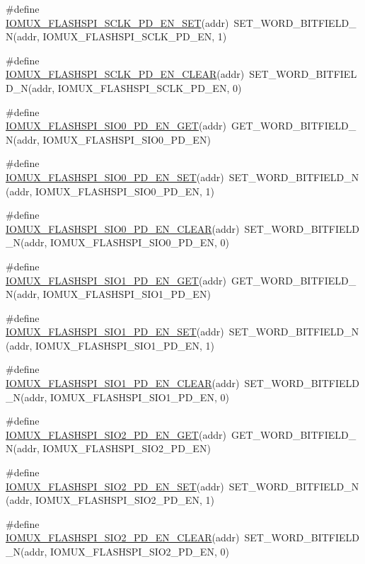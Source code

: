 \begin{DoxyCompactItemize}
\#define \hyperlink{a00559_a5d93eeb597e9b628d1bd05c7233ee576}{IOMUX\_\-FLASHSPI\_\-SCLK\_\-PD\_\-EN\_\-SET}(addr)~SET\_\-WORD\_\-BITFIELD\_\-N(addr, IOMUX\_\-FLASHSPI\_\-SCLK\_\-PD\_\-EN, 1)
\item 
\#define \hyperlink{a00559_a0ef3e525e7ec183a6f9c9f821fcd6159}{IOMUX\_\-FLASHSPI\_\-SCLK\_\-PD\_\-EN\_\-CLEAR}(addr)~SET\_\-WORD\_\-BITFIELD\_\-N(addr, IOMUX\_\-FLASHSPI\_\-SCLK\_\-PD\_\-EN, 0)
\item 
\#define \hyperlink{a00559_a912bccecd8802c114ba8db270a81d986}{IOMUX\_\-FLASHSPI\_\-SIO0\_\-PD\_\-EN\_\-GET}(addr)~GET\_\-WORD\_\-BITFIELD\_\-N(addr, IOMUX\_\-FLASHSPI\_\-SIO0\_\-PD\_\-EN)
\item 
\#define \hyperlink{a00559_ad2c2ae01b2a7109abd76466ffa73b062}{IOMUX\_\-FLASHSPI\_\-SIO0\_\-PD\_\-EN\_\-SET}(addr)~SET\_\-WORD\_\-BITFIELD\_\-N(addr, IOMUX\_\-FLASHSPI\_\-SIO0\_\-PD\_\-EN, 1)
\item 
\#define \hyperlink{a00559_ab7114dd2253ab6a347e89a6a0631cfa2}{IOMUX\_\-FLASHSPI\_\-SIO0\_\-PD\_\-EN\_\-CLEAR}(addr)~SET\_\-WORD\_\-BITFIELD\_\-N(addr, IOMUX\_\-FLASHSPI\_\-SIO0\_\-PD\_\-EN, 0)
\item 
\#define \hyperlink{a00559_a2a32273048798fe0f20cd1c2c74b0a70}{IOMUX\_\-FLASHSPI\_\-SIO1\_\-PD\_\-EN\_\-GET}(addr)~GET\_\-WORD\_\-BITFIELD\_\-N(addr, IOMUX\_\-FLASHSPI\_\-SIO1\_\-PD\_\-EN)
\item 
\#define \hyperlink{a00559_a971f7af788d17b7d01c99dfe754c275d}{IOMUX\_\-FLASHSPI\_\-SIO1\_\-PD\_\-EN\_\-SET}(addr)~SET\_\-WORD\_\-BITFIELD\_\-N(addr, IOMUX\_\-FLASHSPI\_\-SIO1\_\-PD\_\-EN, 1)
\item 
\#define \hyperlink{a00559_a13342cb50d1f37d489363c90dca905a5}{IOMUX\_\-FLASHSPI\_\-SIO1\_\-PD\_\-EN\_\-CLEAR}(addr)~SET\_\-WORD\_\-BITFIELD\_\-N(addr, IOMUX\_\-FLASHSPI\_\-SIO1\_\-PD\_\-EN, 0)
\item 
\#define \hyperlink{a00559_afad954016e6847083059b5d1eb38e656}{IOMUX\_\-FLASHSPI\_\-SIO2\_\-PD\_\-EN\_\-GET}(addr)~GET\_\-WORD\_\-BITFIELD\_\-N(addr, IOMUX\_\-FLASHSPI\_\-SIO2\_\-PD\_\-EN)
\item 
\#define \hyperlink{a00559_a3a686bd6ccda2a15ef28267aa5376909}{IOMUX\_\-FLASHSPI\_\-SIO2\_\-PD\_\-EN\_\-SET}(addr)~SET\_\-WORD\_\-BITFIELD\_\-N(addr, IOMUX\_\-FLASHSPI\_\-SIO2\_\-PD\_\-EN, 1)
\item 
\#define \hyperlink{a00559_a875fc50b25ca7902a15c5272bb61b2b7}{IOMUX\_\-FLASHSPI\_\-SIO2\_\-PD\_\-EN\_\-CLEAR}(addr)~SET\_\-WORD\_\-BITFIELD\_\-N(addr, IOMUX\_\-FLASHSPI\_\-SIO2\_\-PD\_\-EN, 0)
\item 

\end{DoxyCompactItemize}
